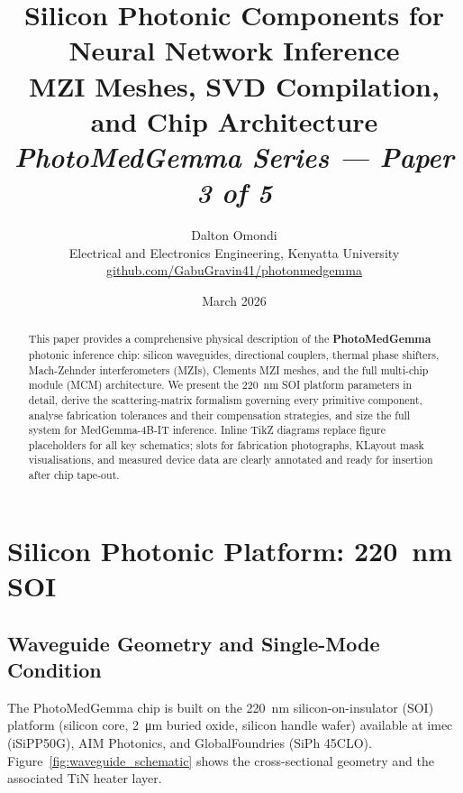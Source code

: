 \documentclass[12pt, a4paper]{article}
\title{%
  \textbf{\textcolor{headcolor}{Silicon Photonic Components for Neural Network Inference}}\\[6pt]
  \large MZI Meshes, SVD Compilation, and Chip Architecture\\[6pt]
  \small \textit{PhotoMedGemma Series — Paper 3 of 5}
}
\author{  Dalton Omondi\\[2pt]
  \small Electrical and Electronics Engineering, Kenyatta University\\[2pt]
  \small \href{https://github.com/GabuGravin41/photonmedgemma}{github.com/GabuGravin41/photonmedgemma}
}
\date{March 2026}
\begin{document}
\maketitle
\tableofcontents
\clearpage

\begin{abstract}
\noindent
This paper provides a comprehensive physical description of the
\textbf{PhotoMedGemma} photonic inference chip: silicon waveguides,
directional couplers, thermal phase shifters, Mach-Zehnder interferometers
(MZIs), Clements MZI meshes, and the full multi-chip module (MCM) architecture.
We present the \SI{220}{\nano\metre} SOI platform parameters in detail,
derive the scattering-matrix formalism governing every primitive component,
analyse fabrication tolerances and their compensation strategies, and size the
full system for MedGemma-4B-IT inference.
Inline TikZ diagrams replace figure placeholders for all key schematics;
slots for fabrication photographs, KLayout mask visualisations, and
measured device data are clearly annotated and ready for insertion after
chip tape-out.
\end{abstract}

\section{Silicon Photonic Platform: \SI{220}{\nano\metre} SOI}
\label{sec:platform}

\subsection{Waveguide Geometry and Single-Mode Condition}

The PhotoMedGemma chip is built on the
\SI{220}{\nano\metre} silicon-on-insulator (SOI) platform
(silicon core, \SI{2}{\micro\metre} buried oxide, silicon handle wafer)
available at imec (iSiPP50G), AIM Photonics, and GlobalFoundries
(SiPh 45CLO). Figure~\ref{fig:waveguide_schematic} shows the cross-sectional
geometry and the associated TiN heater layer.
\end{document}
